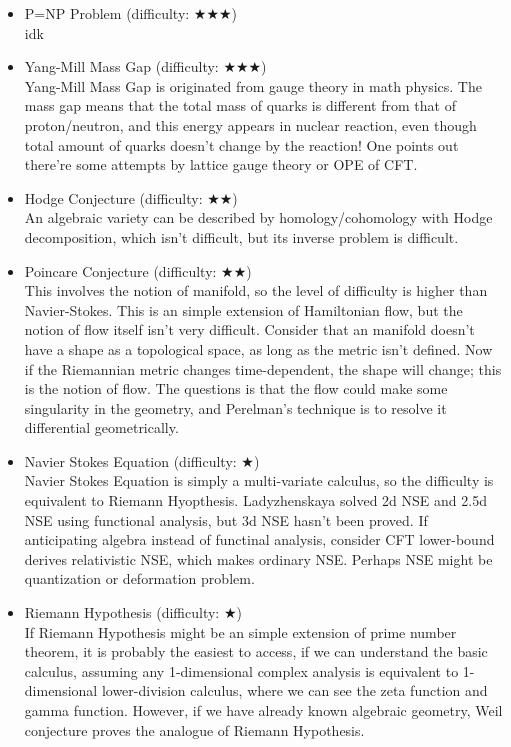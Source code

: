 \documentclass{article}
\begin{document}
\begin{itemize}
\item P=NP Problem (difficulty: $\bigstar\bigstar\bigstar$) \\
idk

\item Yang-Mill Mass Gap (difficulty: $\bigstar\bigstar\bigstar$) \\
Yang-Mill Mass Gap is originated from gauge theory in math physics.
The mass gap means that the total mass of quarks is different from that of proton/neutron,
and this energy appears in nuclear reaction, even though total amount of quarks doesn't change by the reaction!
One points out there're some attempts by lattice gauge theory or OPE of CFT.

\item Hodge Conjecture (difficulty: $\bigstar\bigstar$) \\
An algebraic variety can be described by homology/cohomology with Hodge decomposition, which isn't difficult,
but its inverse problem is difficult.

\item Poincare Conjecture (difficulty: $\bigstar\bigstar$) \\
This involves the notion of manifold, so the level of difficulty is higher than Navier-Stokes.
This is an simple extension of Hamiltonian flow, but the notion of flow itself isn't very difficult.
Consider that an manifold doesn't have a shape as a topological space, as long as the metric isn't defined.
Now if the Riemannian metric changes time-dependent, the shape will change; this is the notion of flow.
The questions is that the flow could make some singularity in the geometry, 
and Perelman's technique is to resolve it differential geometrically.

\item Navier Stokes Equation (difficulty: $\bigstar$) \\
Navier Stokes Equation is simply a multi-variate calculus, so the difficulty is equivalent to Riemann Hyopthesis.
Ladyzhenskaya solved 2d NSE and 2.5d NSE using functional analysis, but 3d NSE hasn't been proved.
If anticipating algebra instead of functinal analysis, consider CFT lower-bound derives relativistic NSE, which makes ordinary NSE.
Perhaps NSE might be quantization or deformation problem.

\item Riemann Hypothesis (difficulty: $\bigstar$) \\
If Riemann Hypothesis might be an simple extension of prime number theorem,
it is probably the easiest to access, if we can understand the basic calculus, assuming any 1-dimensional complex analysis is 
equivalent to 1-dimensional lower-division calculus, where we can see the zeta function and gamma function.
However, if we have already known algebraic geometry, Weil conjecture proves the analogue of Riemann Hypothesis.
\end{itemize}
\end{document}
